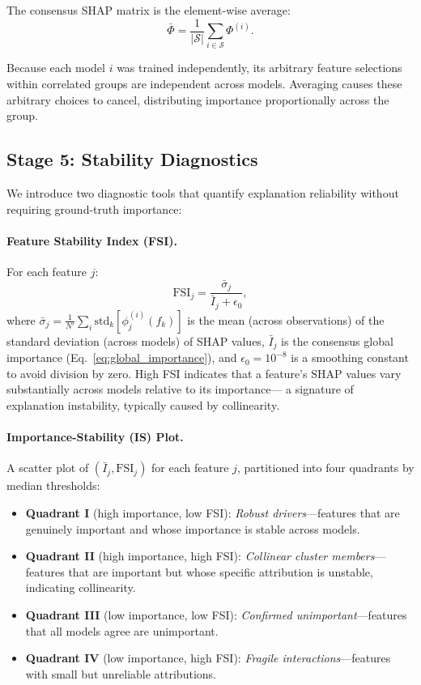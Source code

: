 \documentclass[11pt]{article}
\begin{document}
The consensus SHAP matrix is the element-wise average:
\begin{equation}
  \bar{\Phi} = \frac{1}{|\mathcal{S}|} \sum_{i \in \mathcal{S}} \Phi^{(i)}.
  \label{eq:consensus}
\end{equation}

Because each model $i$ was trained independently, its arbitrary feature
selections within correlated groups are independent across models.
Averaging causes these arbitrary choices to cancel, distributing
importance proportionally across the group.

\subsection{Stage 5: Stability Diagnostics}

We introduce two diagnostic tools that quantify explanation reliability
without requiring ground-truth importance:

\paragraph{Feature Stability Index (FSI).}
For each feature $j$:
\begin{equation}
  \text{FSI}_j = \frac{\bar{\sigma}_j}{\bar{I}_j + \epsilon_0},
  \label{eq:fsi}
\end{equation}
where $\bar{\sigma}_j = \frac{1}{N'}\sum_i \text{std}_k[\phi_j^{(i)}(f_k)]$
is the mean (across observations) of the standard deviation (across models)
of SHAP values, $\bar{I}_j$ is the consensus global importance
(Eq.~\ref{eq:global_importance}), and $\epsilon_0 = 10^{-8}$ is a smoothing
constant to avoid division by zero. High FSI indicates that a feature's
SHAP values vary substantially across models relative to its importance---
a signature of explanation instability, typically caused by collinearity.

\paragraph{Importance-Stability (IS) Plot.}
A scatter plot of $(\bar{I}_j, \text{FSI}_j)$ for each feature $j$,
partitioned into four quadrants by median thresholds:
\begin{itemize}
  \item \textbf{Quadrant I} (high importance, low FSI): \emph{Robust
    drivers}---features that are genuinely important and whose importance
    is stable across models.
  \item \textbf{Quadrant II} (high importance, high FSI): \emph{Collinear
    cluster members}---features that are important but whose specific
    attribution is unstable, indicating collinearity.
  \item \textbf{Quadrant III} (low importance, low FSI): \emph{Confirmed
    unimportant}---features that all models agree are unimportant.
  \item \textbf{Quadrant IV} (low importance, high FSI): \emph{Fragile
    interactions}---features with small but unreliable attributions.
\end{itemize}
\end{document}
